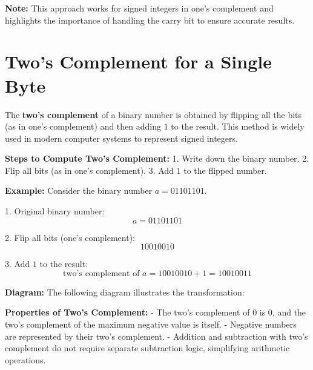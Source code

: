 \documentclass{report}
\begin{document}
\textbf{Note:} This approach works for signed integers in one's complement and highlights the importance of handling the carry bit to ensure accurate results.

\section{Two's Complement for a Single Byte}

The \textbf{two's complement} of a binary number is obtained by flipping all the bits (as in one's complement) and then adding \(1\) to the result. This method is widely used in modern computer systems to represent signed integers.

\textbf{Steps to Compute Two's Complement:}
1. Write down the binary number.
2. Flip all bits (as in one's complement).
3. Add \(1\) to the flipped number.

\textbf{Example:}
Consider the binary number \(a = 01101101\).

1. Original binary number:
\[
	a = 01101101
\]

2. Flip all bits (one's complement):
\[
	10010010
\]

3. Add \(1\) to the result:
\[
	\text{two's complement of } a = 10010010 + 1 = 10010011
\]

\textbf{Diagram:}
The following diagram illustrates the transformation:

\begin{center}
\end{center}

\textbf{Properties of Two's Complement:}
- The two's complement of \(0\) is \(0\), and the two's complement of the maximum negative value is itself.
- Negative numbers are represented by their two's complement.
- Addition and subtraction with two's complement do not require separate subtraction logic, simplifying arithmetic operations.
\end{document}
